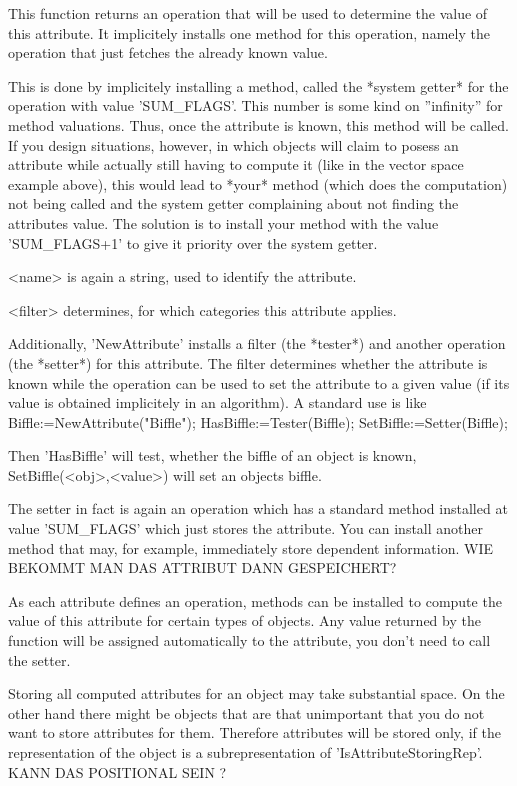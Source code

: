This function returns an operation that will be used to determine the value
of this attribute. It implicitely installs one method for this operation,
namely the operation that just fetches the already known value.

\danger
This is done by implicitely installing a method, called the *system getter*
for the operation with value 'SUM_FLAGS'. This number is some kind on
''infinity'' for method valuations. Thus, once the attribute is known, this
method will be called. If you design situations, however, in
which objects will claim to posess an attribute while actually still having
to compute it (like in the vector space example above), this would lead to
*your* method (which does the computation) not being called and the system
getter complaining about not finding the attributes value. The solution is 
to install your method with the value 'SUM_FLAGS+1' to give it priority
over the system getter.

<name> is again a string, used to identify the attribute.

<filter> determines, for which categories this attribute applies.

Additionally, 'NewAttribute' installs a filter (the *tester*) and another
operation (the *setter*) for this attribute. The
filter determines whether the attribute is known while the operation can be
used to set the attribute to a given value (if its value is obtained
implicitely in an algorithm). A standard use is like
\beginexample
Biffle:=NewAttribute("Biffle");
HasBiffle:=Tester(Biffle);
SetBiffle:=Setter(Biffle);
\endexample

Then 'HasBiffle' will test, whether the biffle of an object is known,
SetBiffle(<obj>,<value>) will set an objects biffle.

\danger
The setter in fact is again an operation which has a standard method
installed at value 'SUM_FLAGS' which just stores the attribute. You can
install another method that may, for example, immediately store
dependent information. WIE BEKOMMT MAN DAS ATTRIBUT DANN GESPEICHERT?

As each attribute defines an operation, methods can be installed to compute 
the value of this attribute for certain types of objects. Any value returned
by the function will be assigned automatically to the attribute, you don't
need to call the setter.

\danger
Storing all computed attributes for an object may take substantial space. On
the other hand there might be objects that are that unimportant that you
do not want to store attributes for them. Therefore attributes will be
stored only, if the representation of the object is a subrepresentation of
'IsAttributeStoringRep'. KANN DAS POSITIONAL SEIN ?


